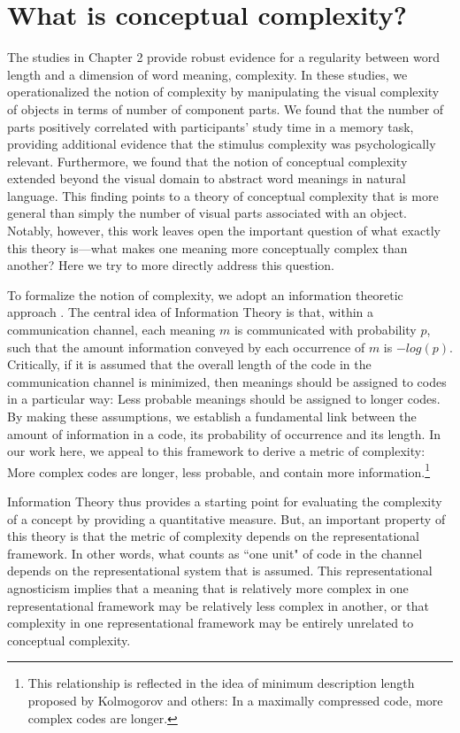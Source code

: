 
\chapter{What is conceptual complexity?}
\label{chapter:complexity}

The studies in Chapter 2 provide robust evidence for a regularity between word length and a dimension of word meaning, complexity. In these studies, we operationalized the notion of complexity by manipulating the visual complexity of objects in terms of number of component parts. We found that the number of parts  positively correlated with participants' study time in a memory task, providing additional evidence that the stimulus complexity was psychologically relevant. Furthermore, we found that the notion of conceptual complexity extended beyond the visual domain to abstract word meanings in natural language. This finding points to a theory of conceptual complexity that is more general than simply the number of visual parts associated with an object.  Notably, however, this work leaves open the important question of what exactly this theory is---what makes one meaning more conceptually complex than another? Here we try to more directly address this question. 

To formalize the notion of complexity, we adopt an information theoretic approach \cite{shannon1948}. The central idea of Information Theory is that, within a communication channel, each meaning $m$ is communicated with probability $p$, such that the amount information conveyed by each occurrence of $m$ is $-log(p)$. Critically, if it is assumed that the overall length of the code in the communication channel is minimized, then meanings should be assigned to codes in a particular way: Less probable meanings should be assigned to longer codes. By making these assumptions, we establish a fundamental link between the amount of information in a code, its probability of occurrence and its length. In our work here, we appeal to this framework to derive a metric of complexity: More complex codes are longer, less probable, and contain more information.\footnote{This relationship is reflected in the idea of minimum description length proposed by Kolmogorov and others: In a maximally compressed code, more complex codes are longer.} 

Information Theory thus provides a  starting point for evaluating the complexity of a concept by providing a quantitative measure. But, an important property of this theory is that the metric of complexity depends on the representational framework. In other words, what counts as ``one unit" of code in the  channel depends on the representational system that is assumed. This representational agnosticism implies that a meaning that is relatively more complex in one representational framework may be relatively less complex in another, or that  complexity in one representational framework may be entirely unrelated to conceptual complexity.

